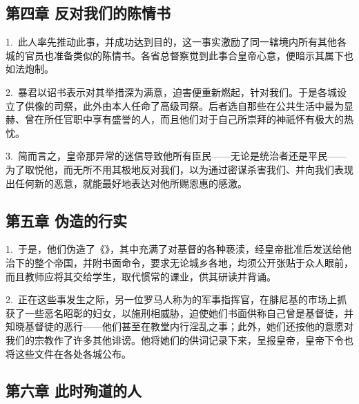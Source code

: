 
\subsection{第四章 反对我们的陈情书}

1.\ 此人率先推动此事，并成功达到目的，这一事实激励了同一辖境内所有其他各城的官员也准备类似的陈情书。各省总督察觉到此事合皇帝心意，便暗示其属下也如法炮制。\par

2.\ 暴君以诏书表示对其举措深为满意，迫害便重新燃起，针对我们。于是各城设立了供像的司祭，此外由本人任命了高级司祭。后者选自那些在公共生活中最为显赫、曾在所任官职中享有盛誉的人，而且他们对于自己所崇拜的神祇怀有极大的热忱。\par

3.\ 简而言之，皇帝那异常的迷信导致他所有臣民——无论是统治者还是平民——为了取悦他，而无所不用其极地反对我们，以为通过密谋杀害我们、并向我们表现出任何新的恶意，就能最好地表达对他所赐恩惠的感激。\par


\subsection{第五章 伪造的行实}

1.\ 于是，他们伪造了《》，其中充满了对基督的各种亵渎，经皇帝批准后发送给他治下的整个帝国，并附书面命令，要求无论城乡各地，均须公开张贴于众人眼前，而且教师应将其交给学生，取代惯常的课业，供其研读并背诵。\par

2.\ 正在这些事发生之际，另一位罗马人称为的军事指挥官，在腓尼基的市场上抓获了一些恶名昭彰的妇女，以施刑相威胁，迫使她们书面供称自己曾是基督徒，并知晓基督徒的恶行——他们甚至在教堂内行淫乱之事；此外，她们还按他的意愿对我们的宗教作了许多其他诽谤。他将她们的供词记录下来，呈报皇帝，皇帝下令也将这些文件在各处各城公布。\par


\subsection{第六章 此时殉道的人}

